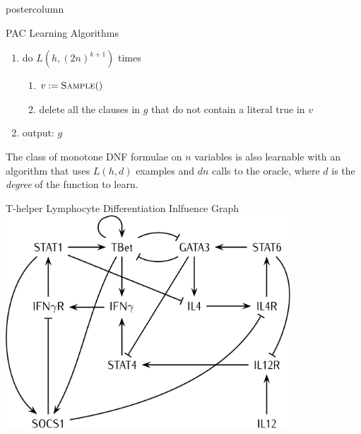 \documentclass[final,hyperref={pdfpagelabels=false},xcolor=dvipsnames]{beamer}
\begin{document}
\begin{frame}[fragile]
\begin{columns}
\begin{column}{.49\textwidth}
\begin{beamercolorbox}[center,wd=\textwidth]{postercolumn}
\begin{minipage}[T]{.95\textwidth}
{\begin{block}{PAC Learning Algorithms \cite{Valiant84cacm}}
\begin{enumerate}
\item do $L(h,(2n)^{k+1})$ times 
\begin{enumerate}
\item $v:=\textsc{Sample}()$
\item delete all the clauses in $g$ that do not contain a literal true in $v$
\end{enumerate}
\item output: $g$
\end{enumerate}
    The class of monotone DNF formulae on $n$ variables is also learnable with an
    algorithm that uses $L(h,d)$ examples and $d n$ calls to the oracle,
    where $d$ is the \emph{degree} of the function to learn.
            \end{block}
            \vfill
            \begin{block}{T-helper Lymphocyte Differentiation Inlfuence Graph \cite{RRMTC06tcsb}}
   \includegraphics[width=0.8\textwidth]{th_net_clean.png}
	    \end{block}
            \vfill
          }
        \end{minipage}
      \end{beamercolorbox}
    \end{column}
    

\end{columns}
\end{frame}
\end{document}
